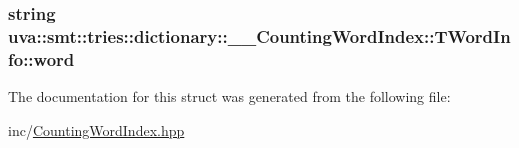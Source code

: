 \subsubsection[{word}]{\setlength{\rightskip}{0pt plus 5cm}string uva\+::smt\+::tries\+::dictionary\+::\+\_\+\+\_\+\+Counting\+Word\+Index\+::\+T\+Word\+Info\+::word}\label{structuva_1_1smt_1_1tries_1_1dictionary_1_1_____counting_word_index_1_1_t_word_info_a374b184f34abd8935cea6f48fe9560fd}


The documentation for this struct was generated from the following file\+:\begin{DoxyCompactItemize}
\item 
inc/\hyperlink{_counting_word_index_8hpp}{Counting\+Word\+Index.\+hpp}\end{DoxyCompactItemize}
